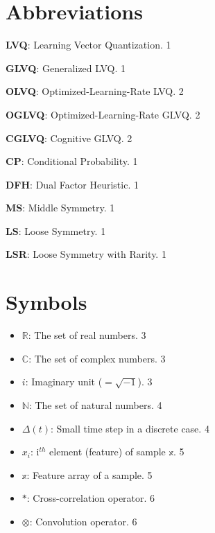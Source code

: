 \documentclass[12pt,twoside]{report}
\begin{document}
\clearpage\begin{spacing}{1.5}
\tableofcontents
\listoffigures
\listoftables



\chapter*{Abbreviations}

\textbf{LVQ}: Learning Vector Quantization. 1

\textbf{GLVQ}: Generalized LVQ. 1

\textbf{OLVQ}: Optimized-Learning-Rate LVQ. 2

\textbf{OGLVQ}: Optimized-Learning-Rate GLVQ. 2

\textbf{CGLVQ}: Cognitive GLVQ. 2

\textbf{CP}: Conditional Probability. 1

\textbf{DFH}: Dual Factor Heuristic. 1

\textbf{MS}: Middle Symmetry. 1

\textbf{LS}: Loose Symmetry. 1

\textbf{LSR}: Loose Symmetry with Rarity. 1

\chapter*{Symbols}
\begin{itemize}

  \item $\mathbb{R}$: The set of real numbers. 3

  \item $\mathbb{C}$: The set of complex numbers. 3

  \item $i$: Imaginary unit ($=\sqrt{-1}$). 3

  \item $\mathbb{N}$: The set of natural numbers. 4

  \item $\Delta(t)$: Small time step in a discrete case. 4

  \item $x_{i}$: i$^{th}$ element (feature) of sample $\mathbb{x}$. 5

  \item $\mathbb{x}$: Feature array of a sample. 5

  \item $\ast$: Cross-correlation operator. 6

  \item $\otimes$: Convolution operator. 6


\end{itemize}
\end{spacing}
\end{document}
